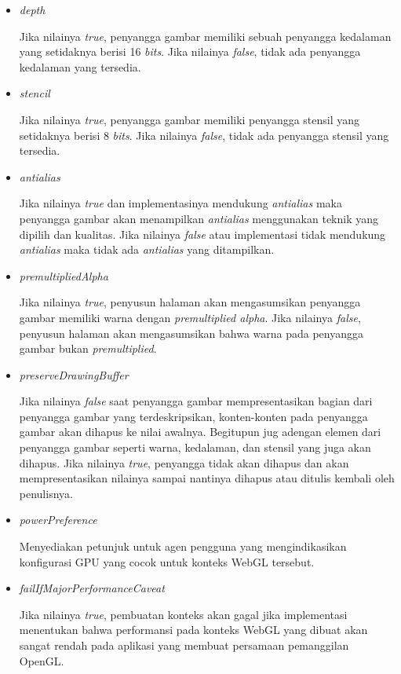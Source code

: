 \begin{enumerate}
\begin{itemize}
	\item {\it depth}
	
	Jika nilainya {\it true}, penyangga gambar memiliki sebuah penyangga kedalaman yang setidaknya berisi 16 {\it bits}. Jika nilainya {\it false}, tidak ada penyangga kedalaman yang tersedia.
	
	\item {\it stencil}
	
	Jika nilainya {\it true}, penyangga gambar memiliki penyangga stensil yang setidaknya berisi 8 {\it bits}. Jika nilainya {\it false}, tidak ada penyangga stensil yang tersedia.
	
	\item {\it antialias}
	
	Jika nilainya {\it true} dan implementasinya mendukung {\it antialias} maka penyangga gambar akan menampilkan {\it antialias} menggunakan teknik yang dipilih dan kualitas. Jika nilainya {\it false} atau implementasi tidak mendukung {\it antialias} maka tidak ada {\it antialias} yang ditampilkan.
	
	\item {\it premultipliedAlpha}
	
	Jika nilainya {\it true}, penyusun halaman akan mengasumsikan penyangga gambar memiliki warna dengan {\it premultiplied alpha}. Jika nilainya {\it false}, penyusun halaman akan mengasumsikan bahwa warna pada penyangga gambar bukan {\it premultiplied}.
	
	\item {\it preserveDrawingBuffer}
	
	Jika nilainya {\it false} saat penyangga gambar mempresentasikan bagian dari penyangga gambar yang terdeskripsikan, konten-konten pada penyangga gambar akan dihapus ke nilai awalnya. Begitupun jug adengan elemen dari penyangga gambar seperti warna, kedalaman, dan stensil yang juga akan dihapus. Jika nilainya {\it true}, penyangga tidak akan dihapus dan akan mempresentasikan nilainya sampai nantinya dihapus atau ditulis kembali oleh penulisnya.
	
	\item {\it powerPreference}
	
	Menyediakan petunjuk untuk agen pengguna yang mengindikasikan konfigurasi GPU yang cocok untuk konteks WebGL tersebut.
	
	\item {\it failIfMajorPerformanceCaveat}
	
	Jika nilainya {\it true}, pembuatan konteks akan gagal jika implementasi menentukan bahwa performansi pada konteks WebGL yang dibuat akan sangat rendah pada aplikasi yang membuat persamaan pemanggilan OpenGL.
	

\end{itemize}
\end{enumerate}
